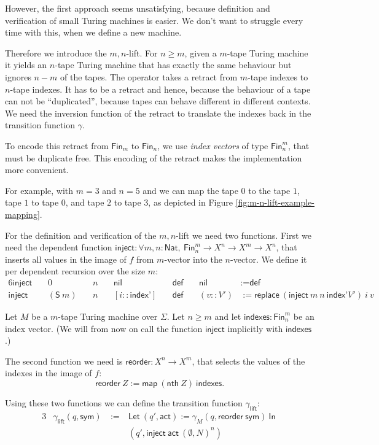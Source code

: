 \documentclass{psartcl}
\newcommand{\MS}[1]{\textsf{#1}}
\newcommand{\nil}{\MS{nil}}
\newcommand{\from}{:}
\renewcommand{\to}{\rightarrow}
\newcommand{\Fin}{\MS{Fin}}
\newcommand{\Nat}{\MS{Nat}}
\renewcommand{\None}{\emptyset}
\newcommand{\mlet}[2]{\MS{Let}~#1~\MS{In}~#2}
\newcommand{\map}{\ensuremath{\MS{map}}}
\begin{document}
However, the first approach seems unsatisfying, because definition and verification of small Turing machines is easier.  We don't want to struggle
every time with this, when we define a new machine.

Therefore we introduce the $m,n$-lift. For $n \ge m$, given a $m$-tape Turing machine it yields an $n$-tape Turing machine that has exactly the
same behaviour but ignores $n-m$ of the tapes.  The operator takes a retract from $m$-tape indexes to $n$-tape indexes.  It has to be a retract and
hence, because the behaviour of a tape can not be ``duplicated'', because tapes can behave different in different contexts.  We need the inversion
function of the retract to translate the indexes back in the transition function $\gamma$.

To encode this retract from $\Fin_m$ to $\Fin_n$, we use \emph{index vectors} of type $\Fin_n^m$, that must be duplicate free.  This encoding of the retract makes the implementation more convenient.

For example, with $m=3$ and $n=5$ and we can  map the tape $0$ to the tape $1$, tape $1$ to tape $0$, and tape $2$ to tape $3$, as depicted in Figure
\ref{fig:m-n-lift-example-mapping}.

For the definition and verification of the $m,n$-lift we need two functions.
First we need the dependent function
$\MS{inject} \from \forall m, n:\Nat,~\Fin_n^m \to X^n \to X^m \to X^n$,
that inserts all values in the image of $f$ from $m$-vector into the $n$-vector.  We define it per dependent recursion over the size $m$:
\begin{alignat*}{6}
  \MS{inject}&&~ 0         && ~ n &&~ \nil                &&~ \MS{def} &&~ \nil      &:= \MS{def} \\
  \MS{inject}&&~ (\MS S~m) && ~ n &&~ [i :: \MS{index'}]  &&~ \MS{def} &&~ (v :: V') &:= \MS{replace}~(\MS{inject}~m~n~\MS{index'} V')~i~v
\end{alignat*}

Let $M$ be a $m$-tape Turing machine over $\Sigma$.  Let $n \ge m$ and let $\MS{indexes}:\Fin_n^m$ be an index vector.
(We will from now on call the function $\MS{inject}$ implicitly with $\MS{indexes}$.)

The second function we need is $\MS{reorder} \from X^n \to X^m$, that selects the values of the indexes in the image of $f$:
$$\MS{reorder}~Z := \map~(\MS{nth}~Z)~\MS{indexes}.$$

Using these two functions we can define the transition function $\gamma_{\MS{lift}}$:
\begin{alignat*}{3}
  &\gamma_{\MS{lift}} (q, \MS{sym})  &~:=~& \mlet {(q', \MS{act}) := \gamma_M(q, \MS{reorder}~\MS{sym})}{\\
  &                                  &~  ~& (q',\MS{inject}~\MS{act}~(\None, N)^n)}
\end{alignat*}
\end{document}
